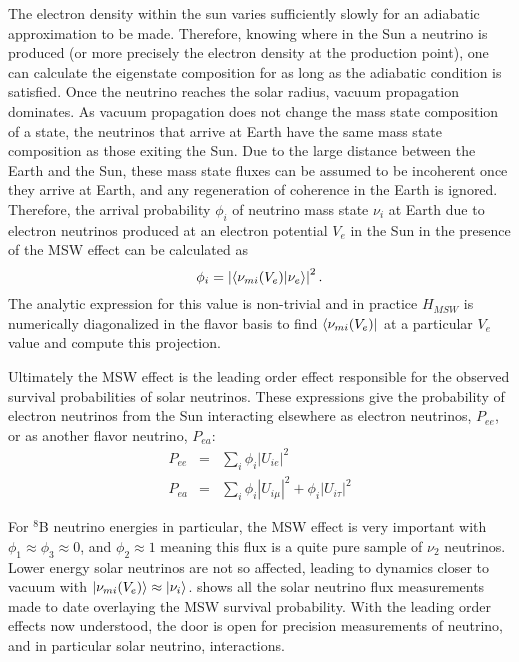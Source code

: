 The electron density within the sun varies sufficiently slowly for an adiabatic approximation to be made.
Therefore, knowing where in the Sun a neutrino is produced (or more precisely the electron density at the production point), one can calculate the eigenstate composition for as long as the adiabatic condition is satisfied.
Once the neutrino reaches the solar radius, vacuum propagation dominates. 
As vacuum propagation does not change the mass state composition of a state, the neutrinos that arrive at Earth have the same mass state composition as those exiting the Sun.
Due to the large distance between the Earth and the Sun, these mass state fluxes can be assumed to be incoherent once they arrive at Earth, and any regeneration of coherence in the Earth is ignored.
Therefore, the arrival probability $\phi_i$ of neutrino mass state $\nu_i$ at Earth due to electron neutrinos produced at an electron potential $V_e$ in the Sun in the presence of the MSW effect can be calculated as
\begin{equation}
\phi_i = \left| \braket{\nu_{m i}(V_e)}{\nu_e} \right|^2.
\label{rawflux}
\end{equation}
The analytic expression for this value is non-trivial and in practice $H_{MSW}$ is numerically diagonalized in the flavor basis to find $\bra{\nu_{m i}(V_e)}$ at a particular $V_e$ value and compute this projection.

Ultimately the MSW effect is the leading order effect responsible for the observed survival probabilities of solar neutrinos.
These expressions give the probability of electron neutrinos from the Sun interacting elsewhere as electron neutrinos, $P_{ee}$, or as another flavor neutrino, $P_{ea}$:
\begin{equation}
\begin{array}{rcl}
P_{ee} & = & \sum_i \phi_i |U_{ie}|^2  \\
P_{ea} & = & \sum_i \phi_i |U_{i\mu}|^2 + \phi_i |U_{i\tau}|^2
\end{array}
\label{survive}
\end{equation}

For $^8$B neutrino energies in particular, the MSW effect is very important with $\phi_1 \approx \phi_3 \approx 0$, and $\phi_2 \approx 1$ meaning this flux is a quite pure sample of $\nu_2$ neutrinos. 
Lower energy solar neutrinos are not so affected, leading to dynamics closer to vacuum with $\ket{\nu_{mi}(V_e)} \approx \ket{\nu_i}$.
 shows all the solar neutrino flux measurements made to date overlaying the MSW survival probability.
With the leading order effects now understood, the door is open for precision measurements of neutrino, and in particular solar neutrino, interactions.

